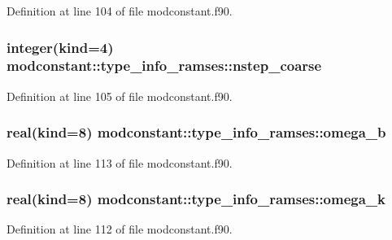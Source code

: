 Definition at line 104 of file modconstant.\-f90.

\hypertarget{structmodconstant_1_1type__info__ramses_a0ca1ca782af8a086821dde9da5be5812}{
\subsubsection[{nstep\-\_\-coarse}]{\setlength{\rightskip}{0pt plus 5cm}integer(kind=4) modconstant\-::type\-\_\-info\-\_\-ramses\-::nstep\-\_\-coarse}}\label{structmodconstant_1_1type__info__ramses_a0ca1ca782af8a086821dde9da5be5812}


Definition at line 105 of file modconstant.\-f90.

\hypertarget{structmodconstant_1_1type__info__ramses_a32632cab5a6f3cd851bdd10da410a093}{
\subsubsection[{omega\-\_\-b}]{\setlength{\rightskip}{0pt plus 5cm}real(kind=8) modconstant\-::type\-\_\-info\-\_\-ramses\-::omega\-\_\-b}}\label{structmodconstant_1_1type__info__ramses_a32632cab5a6f3cd851bdd10da410a093}


Definition at line 113 of file modconstant.\-f90.

\hypertarget{structmodconstant_1_1type__info__ramses_a48a40eea37a04b57ac5ec74b0dc7c7fd}{
\subsubsection[{omega\-\_\-k}]{\setlength{\rightskip}{0pt plus 5cm}real(kind=8) modconstant\-::type\-\_\-info\-\_\-ramses\-::omega\-\_\-k}}\label{structmodconstant_1_1type__info__ramses_a48a40eea37a04b57ac5ec74b0dc7c7fd}


Definition at line 112 of file modconstant.\-f90.

